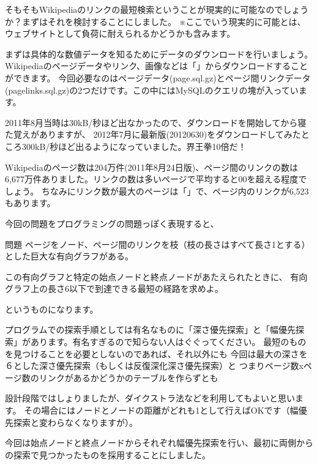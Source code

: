 \documentclass{jsarticle}
\begin{document}
そもそもWikipediaのリンクの最短検索ということが現実的に可能なのでしょうか？まずはそれを検討することにしました。
※ここでいう現実的に可能とは、ウェブサイトとして負荷に耐えられるかどうかも含みます。

まずは具体的な数値データを知るためにデータのダウンロードを行いましょう。
Wikipediaのページデータやリンク、画像などは「」からダウンロードすることができます。
今回必要なのはページデータ(page.sql.gz)とページ間リンクデータ(pagelinks.sql.gz)の2つだけです。この中にはMySQLのクエリの塊が入っています。

2011年8月当時は30kB/秒ほど出なかったので、ダウンロードを開始してから寝た覚えがありますが、
2012年7月に最新版(20120630)をダウンロードしてみたところ300kB/秒ほど出るようになっていました。界王拳10倍だ！

Wikipediaのページ数は204万件(2011年8月24日版)、ページ間のリンクの数は6,677万件ありました。リンクの数は多いページで平均すると00を超える程度でしょう。
ちなみにリンク数が最大のページは「」で、ページ内のリンクが6,523もあります。

今回の問題をプログラミングの問題っぽく表現すると、
\begin{itembox}{問題}
ページをノード、ページ間のリンクを枝（枝の長さはすべて長さ1とする）とした巨大な有向グラフがある。

この有向グラフと特定の始点ノードと終点ノードがあたえられたときに、
有向グラフ上の長さ6以下で到達できる最短の経路を求めよ。
\end{itembox}
というものになります。

プログラムでの探索手順としては有名なものに「深さ優先探索」と「幅優先探索」があります。有名すぎるので知らない人はぐぐってください。
最短のものを見つけることを必要としないのであれば、それ以外にも
今回は最大の深さを６とした深さ優先探索（もしくは反復深化深さ優先探索）と
つまりページ数xページ数のリンクがあるかどうかのテーブルを作らずとも

設計段階ではしょりましたが、ダイクストラ法などを利用してもよいと思います。
その場合にはノードとノードの距離がどれも1として行えばOKです（幅優先探索と変わらなくなりますが）。

今回は始点ノードと終点ノードからそれぞれ幅優先探索を行い、最初に両側からの探索で見つかったものを採用することにしました。
\end{document}
